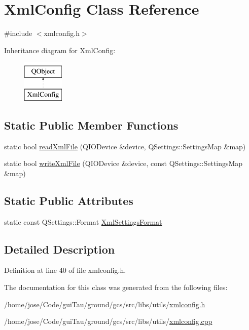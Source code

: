\hypertarget{class_xml_config}{\section{Xml\-Config Class Reference}
\label{class_xml_config}
}


{\ttfamily \#include $<$xmlconfig.\-h$>$}

Inheritance diagram for Xml\-Config\-:\begin{figure}[H]
\begin{center}
\leavevmode
\includegraphics[height=2.000000cm]{class_xml_config}
\end{center}
\end{figure}
\subsection*{Static Public Member Functions}
\begin{DoxyCompactItemize}
\item 
static bool \hyperlink{group__importexportplugin_gaaac43e2b7105e05bbc6c996a6d1e7944}{read\-Xml\-File} (Q\-I\-O\-Device \&device, Q\-Settings\-::\-Settings\-Map \&map)
\item 
static bool \hyperlink{group__importexportplugin_ga2e9b6064b59c93e1c7bebdce1a672d68}{write\-Xml\-File} (Q\-I\-O\-Device \&device, const Q\-Settings\-::\-Settings\-Map \&map)
\end{DoxyCompactItemize}
\subsection*{Static Public Attributes}
\begin{DoxyCompactItemize}
\item 
static const Q\-Settings\-::\-Format \hyperlink{group__importexportplugin_ga86ce5e7b6d81b6da071f57e2f237e9f2}{Xml\-Settings\-Format}
\end{DoxyCompactItemize}


\subsection{Detailed Description}


Definition at line 40 of file xmlconfig.\-h.



The documentation for this class was generated from the following files\-:\begin{DoxyCompactItemize}
\item 
/home/jose/\-Code/gui\-Tau/ground/gcs/src/libs/utils/\hyperlink{xmlconfig_8h}{xmlconfig.\-h}\item 
/home/jose/\-Code/gui\-Tau/ground/gcs/src/libs/utils/\hyperlink{xmlconfig_8cpp}{xmlconfig.\-cpp}\end{DoxyCompactItemize}
